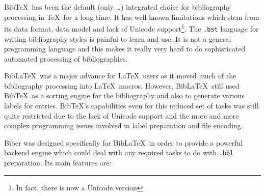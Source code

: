 \documentclass{ltxdockit}
\begin{document}
Bib\TeX\ has been the default (only \ldots) integrated choice for
bibliography processing in \TeX\ for a long time. It has well known
limitations which stem from its data format, data model and lack of Unicode
support\footnote{In fact, there is now a Unicode version}. The
\verb+.bst+ language for writing bibliography styles is painful to learn
and use. It is not a general programming language and this makes it really
very hard to do sophisticated automated processing of bibliographies.

Bib\LaTeX\ was a major advance for \LaTeX\ users as it moved much
of the bibliography processing into \LaTeX\ macros. However,
Bib\LaTeX\ still used Bib\TeX\ as a sorting engine for the
bibliography and also to generate various labels for
entries. Bib\TeX's capabilities even for this reduced set of
tasks was still quite restricted due to the lack of Unicode support and
the more and more complex programming issues involved in label
preparation and file encoding.

Biber was designed specifically for Bib\LaTeX\ in order to
provide a powerful backend engine which could deal with any required
tasks to do with \verb+.bbl+ preparation. Its main features are:
\end{document}
